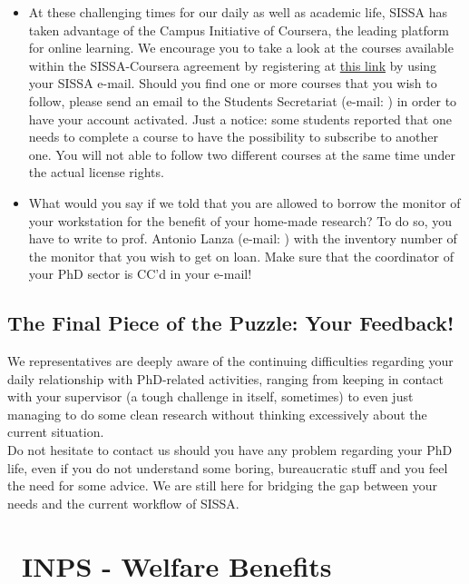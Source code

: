 \documentclass{sissavademecum}
\begin{document}
\begin{itemize}
	\item At these challenging times for our daily as well as academic life, SISSA has taken advantage of the Campus Initiative of Coursera, the leading platform for online learning. We encourage you to take a look at the courses available within the SISSA-Coursera agreement by registering at \href{https://www.coursera.org/programs/sissa-on-coursera-dkw8c}{this link} by using your SISSA e-mail. Should you find one or more courses that you wish to follow, please send an email to the Students Secretariat (e-mail: ) in order to have your account activated. Just a notice: some students reported that one needs to complete a course to have the possibility to subscribe to another one. You will not able to follow two different courses at the same time under the actual license rights.
	
	\item What would you say if we told that you are allowed to borrow the monitor of your workstation for the benefit of your home-made research? To do so, you have to write to prof. Antonio Lanza (e-mail: ) with the inventory number of the monitor that you wish to get on loan. Make sure that the coordinator of your PhD sector is CC'd in your e-mail!
\end{itemize}

\section{The Final Piece of the Puzzle: Your Feedback!}
We representatives are deeply aware of the continuing difficulties regarding your daily relationship with PhD-related activities, ranging from keeping in contact with your supervisor (a tough challenge in itself, sometimes) to even just managing to do some clean research without thinking excessively about the current situation. \\
Do not hesitate to contact us should you have any problem regarding your PhD life, even if you do not understand some boring, bureaucratic stuff and you feel the need for some advice. We are still here for bridging the gap between your needs and the current workflow of SISSA.




\chapter{\texorpdfstring{\faFileInvoiceDollar\ }{}INPS - Welfare Benefits}
\label{sec:gestione_separata_inps}
\end{document}
